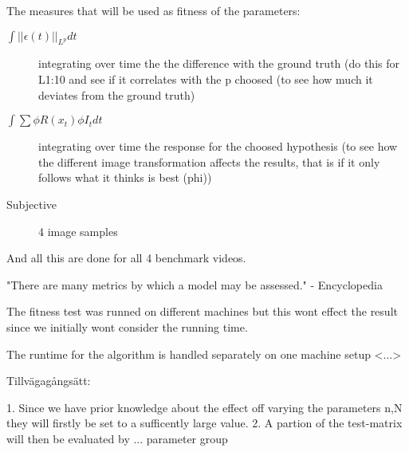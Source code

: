 The measures that will be used as fitness of the parameters:
    \begin{description}
        \item[$\int{||\epsilon(t)||_{L^p}}dt$]
            integrating over time the the difference
            with the ground truth (do this for L{1:10} and see if it correlates with
            the p choosed (to see how much it deviates from the ground truth)
        \item[$\int{\sum{\phi{R(x_t)}\phi{I_t}} }dt$] 
            integrating over time the response
            for the choosed hypothesis (to see how the different image transformation
            affects the results, that is if it only follows what it thinks is best
            (phi))
        \item[Subjective] 4 image samples
    \end{description}
And all this are done for all 4 benchmark videos.


"There are many metrics by which a model may be assessed." - Encyclopedia


The fitness test was runned on different machines but this wont effect the
result since we initially wont consider the running time.

The runtime for the algorithm is handled separately on one machine setup <...>



Tillvägagångsätt:

1. Since we have prior knowledge about the effect off varying the parameters n,N
they will firstly be set to a sufficently large value.
2. A partion of the test-matrix will then be evaluated by ... parameter group 
